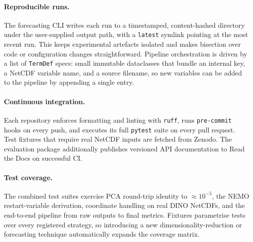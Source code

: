 \documentclass{article}
\begin{document}
\paragraph{Reproducible runs.}
The forecasting CLI writes each run to a timestamped, content-hashed
directory under the user-supplied output path, with a
\texttt{latest} symlink pointing at the most recent run. This keeps
experimental artefacts isolated and makes bisection over code or
configuration changes straightforward. Pipeline orchestration is driven
by a list of \texttt{TermDef} specs: small immutable dataclasses that
bundle an internal key, a NetCDF variable name, and a source filename,
so new variables can be added to the pipeline by appending a single
entry.

\paragraph{Continuous integration.}
Each repository enforces formatting and linting with \texttt{ruff}, runs
\texttt{pre-commit} hooks on every push, and executes its full
\texttt{pytest} suite on every pull request. Test fixtures that require
real NetCDF inputs are fetched from Zenodo. The evaluation package
additionally publishes versioned API documentation to Read the Docs on
successful CI.

\paragraph{Test coverage.}
The combined test suites exercise PCA round-trip identity to
$\approx 10^{-5}$, the NEMO restart-variable derivation, coordinate
handling on real DINO NetCDFs, and the end-to-end pipeline from raw
outputs to final metrics. Fixtures parametrise tests over every
registered strategy, so introducing a new dimensionality-reduction or
forecasting technique automatically expands the coverage matrix.






\end{document}
